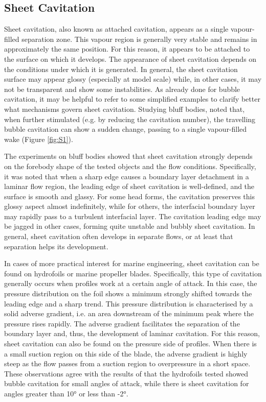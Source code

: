 \subsection{Sheet Cavitation}
Sheet cavitation, also known as attached cavitation, appears as a single vapour-filled separation zone. This vapour region is generally very stable and remains in approximately the same position. For this reason, it appears to be attached to the surface on which it develops. 
The appearance of sheet cavitation depends on the conditions under which it is generated. In general, the sheet cavitation surface may appear glossy (especially at model scale) while, in other cases, it may not be transparent and show some instabilities.
As already done for bubble cavitation, it may be helpful to refer to some simplified examples to clarify better what mechanisms govern sheet cavitation.
Studying bluff bodies, \cite{Brennen_1970} noted that, when further stimulated (e.g. by reducing the cavitation number), the travelling bubble cavitation can show a sudden change, passing to a single vapour-filled wake (Figure \ref{fig:S1}).

The experiments on bluff bodies showed that sheet cavitation strongly depends on the forebody shape of the tested objects and the flow conditions. Specifically, it was noted that when a sharp edge causes a boundary layer detachment in a laminar flow region, the leading edge of sheet cavitation is well-defined, and the surface is smooth and glassy. For some head forms, the cavitation preserves this glossy aspect almost indefinitely, while for others, the interfacial boundary layer may rapidly pass to a turbulent interfacial layer. 
The cavitation leading edge may be jagged in other cases, forming quite unstable and bubbly sheet cavitation.
In general, sheet cavitation often develops in separate flows, or at least that separation helps its development.

In cases of more practical interest for marine engineering, sheet cavitation can be found on hydrofoils or marine propeller blades. Specifically, this type of cavitation generally occurs when profiles work at a certain angle of attack. In this case, the pressure distribution on the foil shows a minimum strongly shifted towards the leading edge and a sharp trend. This pressure distribution is characterised by a solid adverse gradient, i.e. an area downstream of the minimum peak where the pressure rises rapidly. The adverse gradient facilitates the separation of the boundary layer and, thus, the development of laminar cavitation. 
For this reason, sheet cavitation can also be found on the pressure side of profiles. When there is a small suction region on this side of the blade, the adverse gradient is highly steep as the flow passes from a suction region to overpressure in a short space.
These observations agree with the results of \cite{Kermeen1956} that the hydrofoils tested showed bubble cavitation for small angles of attack, while there is sheet cavitation for angles greater than 10° or less than -2°.

